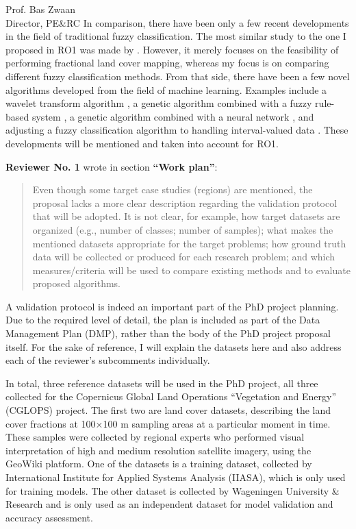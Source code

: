\documentclass[a4paper,10pt,backaddress=false]{scrartcl}
\begin{document}
\begin{letter}{Prof. Bas Zwaan \\ Director, PE\&RC}
In comparison, there have been only a few recent developments in the field of traditional fuzzy classification. The most similar study to the one I proposed in RO1 was made by \citet{colditz_land_2011}. However, it merely focuses on the feasibility of performing fractional land cover mapping, whereas my focus is on comparing different fuzzy classification methods. From that side, there have been a few novel algorithms developed from the field of machine learning. Examples include a wavelet transform algorithm \citep{uma_shankar_wavelet-fuzzy_2011}, a genetic algorithm combined with a fuzzy rule-based system \citep{stavrakoudis_boosted_2011}, a genetic algorithm combined with a neural network \citep{chatterjee_forest_2016}, and adjusting a fuzzy classification algorithm to handling interval-valued data \citep{yu_land_2014}. These developments will be mentioned and taken into account for RO1.

\bigskip

\textbf{Reviewer No. 1} wrote in section \textbf{``Work plan''}:

\blockquote{Even though some target case studies (regions) are mentioned, the proposal lacks a more clear description regarding the validation protocol that will be adopted. It is not clear, for example, how target datasets are organized (e.g., number of classes; number of samples); what makes the mentioned datasets appropriate for the target problems; how ground truth data will be collected or produced for each research problem; and which measures/criteria will be used to compare existing methods and to evaluate proposed algorithms.}

A validation protocol is indeed an important part of the PhD project planning. Due to the required level of detail, the plan is included as part of the Data Management Plan (DMP), rather than the body of the PhD project proposal itself. For the sake of reference, I will explain the datasets here and also address each of the reviewer's subcomments individually.

In total, three reference datasets will be used in the PhD project, all three collected for the Copernicus Global Land Operations ``Vegetation and Energy'' (CGLOPS) project. The first two are land cover datasets, describing the land cover fractions at 100×100 m sampling areas at a particular moment in time. These samples were collected by regional experts who performed visual interpretation of high and medium resolution satellite imagery, using the GeoWiki platform. One of the datasets is a training dataset, collected by International Institute for Applied Systems Analysis (IIASA), which is only used for training models. The other dataset is collected by Wageningen University \& Research and is only used as an independent dataset for model validation and accuracy assessment.


\end{letter}
\end{document}
